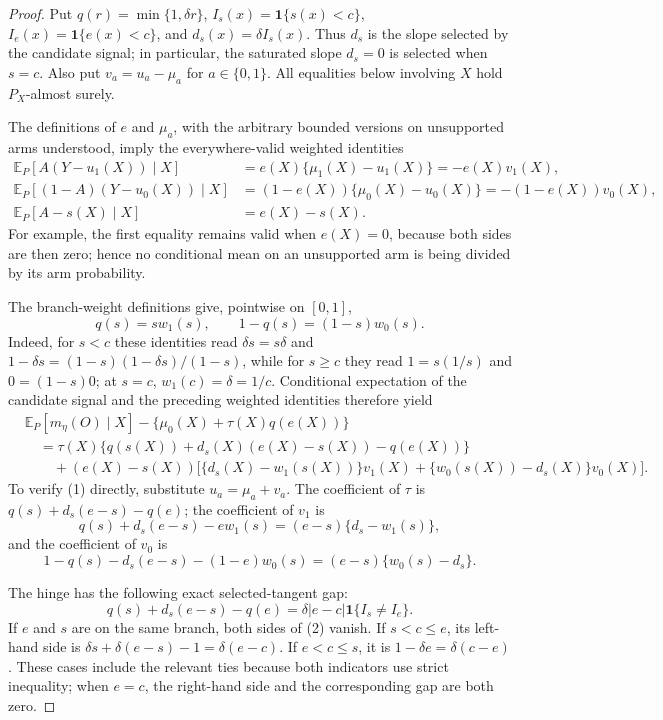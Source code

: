\documentclass{article}
\begin{document}
\begin{proof}
Put \(q(r)=\min\{1,\delta r\}\), \(I_s(x)=\mathbf 1\{s(x)<c\}\), \(I_e(x)=\mathbf 1\{e(x)<c\}\), and \(d_s(x)=\delta I_s(x)\).  Thus \(d_s\) is the slope selected by the candidate signal; in particular, the saturated slope \(d_s=0\) is selected when \(s=c\).  Also put \(v_a=u_a-\mu_a\) for \(a\in\{0,1\}\).  All equalities below involving \(X\) hold \(P_X\)-almost surely.

The definitions of \(e\) and \(\mu_a\), with the arbitrary bounded versions on unsupported arms understood, imply the everywhere-valid weighted identities
\[
\begin{aligned}
 \mathbb E_P[A(Y-u_1(X))\mid X]
 &=e(X)\{\mu_1(X)-u_1(X)\}=-e(X)v_1(X),\\
 \mathbb E_P[(1-A)(Y-u_0(X))\mid X]
 &=(1-e(X))\{\mu_0(X)-u_0(X)\}=-(1-e(X))v_0(X),\\
 \mathbb E_P[A-s(X)\mid X]&=e(X)-s(X).
\end{aligned}
\]
For example, the first equality remains valid when \(e(X)=0\), because both sides are then zero; hence no conditional mean on an unsupported arm is being divided by its arm probability.

The branch-weight definitions give, pointwise on \([0,1]\),
\[
 q(s)=s w_1(s),\qquad 1-q(s)=(1-s)w_0(s).
\]
Indeed, for \(s<c\) these identities read \(\delta s=s\delta\) and \(1-\delta s=(1-s)(1-\delta s)/(1-s)\), while for \(s\ge c\) they read \(1=s(1/s)\) and \(0=(1-s)0\); at \(s=c\), \(w_1(c)=\delta=1/c\).  Conditional expectation of the candidate signal and the preceding weighted identities therefore yield
\[
\begin{aligned}
 &\mathbb E_P[m_\eta(O)\mid X]-\{\mu_0(X)+\tau(X)q(e(X))\}\\
 &\quad=\tau(X)\{q(s(X))+d_s(X)(e(X)-s(X))-q(e(X))\}\\
 &\qquad +(e(X)-s(X))
 \bigl[\{d_s(X)-w_1(s(X))\}v_1(X)
       +\{w_0(s(X))-d_s(X)\}v_0(X)\bigr].
\end{aligned}
\tag{1}
\]
To verify (1) directly, substitute \(u_a=\mu_a+v_a\).  The coefficient of \(\tau\) is \(q(s)+d_s(e-s)-q(e)\); the coefficient of \(v_1\) is
\[
 q(s)+d_s(e-s)-e w_1(s)=(e-s)\{d_s-w_1(s)\},
\]
and the coefficient of \(v_0\) is
\[
 1-q(s)-d_s(e-s)-(1-e)w_0(s)=(e-s)\{w_0(s)-d_s\}.
\]

The hinge has the following exact selected-tangent gap:
\[
 q(s)+d_s(e-s)-q(e)
 =\delta |e-c|\mathbf 1\{I_s\ne I_e\}.
\tag{2}
\]
If \(e\) and \(s\) are on the same branch, both sides of (2) vanish.  If \(s<c\le e\), its left-hand side is \(\delta s+\delta(e-s)-1=\delta(e-c)\).  If \(e<c\le s\), it is \(1-\delta e=\delta(c-e)\).  These cases include the relevant ties because both indicators use strict inequality; when \(e=c\), the right-hand side and the corresponding gap are both zero.


\end{proof}
\end{document}
